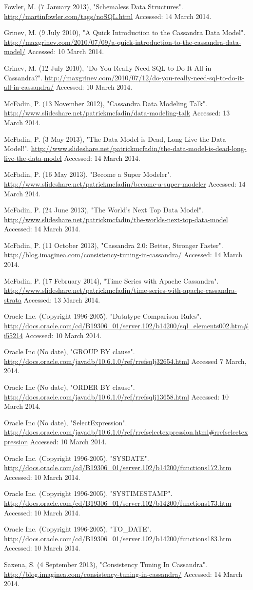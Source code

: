 \documentclass[letterpaper]{article}
\begin{document}
Fowler, M. (7 January 2013), "Schemaless Data Structures".
\url{http://martinfowler.com/tags/noSQL.html}
Accessed: 14 March 2014.

Grinev, M. (9 July 2010), "A Quick Introduction to the Cassandra Data Model".
\url{http://maxgrinev.com/2010/07/09/a-quick-introduction-to-the-cassandra-data-model/}
Accessed: 10 March 2014.

Grinev, M. (12 July 2010), "Do You Really Need SQL to Do It All in Cassandra?".
\url{ http://maxgrinev.com/2010/07/12/do-you-really-need-sql-to-do-it-all-in-cassandra/}
Accessed: 10 March 2014.

McFadin, P. (13 November 2012), "Cassandra Data Modeling Talk".
\url{http://www.slideshare.net/patrickmcfadin/data-modeling-talk}
Accessed: 13 March 2014.

McFadin, P. (3 May 2013), "The Data Model is Dead, Long Live the Data Model!".
\url{http://www.slideshare.net/patrickmcfadin/the-data-model-is-dead-long-live-the-data-model}
Accessed: 14 March 2014.

McFadin, P. (16 May 2013), "Become a Super Modeler".
\url{http://www.slideshare.net/patrickmcfadin/become-a-super-modeler}
Accessed: 14 March 2014.

McFadin, P. (24 June 2013), "The World's Next Top Data Model".
\url{http://www.slideshare.net/patrickmcfadin/the-worlds-next-top-data-model}
Accessed: 14 March 2014.

McFadin, P. (11 October 2013), "Cassandra 2.0: Better, Stronger Faster".
\url{http://blog.imaginea.com/consistency-tuning-in-cassandra/}
Accessed: 14 March 2014.

McFadin, P. (17 February 2014), "Time Series with Apache Cassandra".
\url{http://www.slideshare.net/patrickmcfadin/time-series-with-apache-cassandra-strata}
Accessed: 13 March 2014.

Oracle Inc. (Copyright 1996-2005), "Datatype Comparison Rules".
\url{http://docs.oracle.com/cd/B19306_01/server.102/b14200/sql_elements002.htm#i55214}
Accessed: 10 March 2014.

Oracle Inc (No date), "GROUP BY clause".
\url{http://docs.oracle.com/javadb/10.6.1.0/ref/rrefsqlj32654.html}
Accessed 7 March, 2014.

Oracle Inc (No date), "ORDER BY clause".
\url{http://docs.oracle.com/javadb/10.6.1.0/ref/rrefsqlj13658.html}
Accessed: 10 March 2014.

Oracle Inc (No date), "SelectExpression".
\url{http://docs.oracle.com/javadb/10.6.1.0/ref/rrefselectexpression.html#rrefselectexpression}
Accessed: 10 March 2014.

Oracle Inc. (Copyright 1996-2005), "SYSDATE".
\url{http://docs.oracle.com/cd/B19306_01/server.102/b14200/functions172.htm}
Accessed: 10 March 2014.

Oracle Inc. (Copyright 1996-2005), "SYSTIMESTAMP".
\url{http://docs.oracle.com/cd/B19306_01/server.102/b14200/functions173.htm}
Accessed: 10 March 2014.

Oracle Inc. (Copyright 1996-2005), "TO\_DATE".
\url{http://docs.oracle.com/cd/B19306_01/server.102/b14200/functions183.htm}
Accessed: 10 March 2014.

Saxena, S. (4 September 2013), "Consistency Tuning In Cassandra".
\url{http://blog.imaginea.com/consistency-tuning-in-cassandra/}
Accessed: 14 March 2014.
\end{document}
